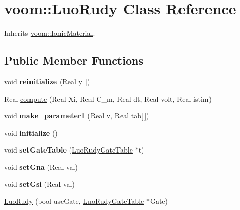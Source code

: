 \hypertarget{classvoom_1_1_luo_rudy}{
\section{voom::LuoRudy Class Reference}
\label{classvoom_1_1_luo_rudy}
}


Inherits \hyperlink{classvoom_1_1_ionic_material}{voom::IonicMaterial}.\subsection*{Public Member Functions}
\begin{DoxyCompactItemize}
\item 
\hypertarget{classvoom_1_1_luo_rudy_a5596df5583aac77101b82ad5719138d2}{
void {\bfseries reinitialize} (Real y\mbox{[}$\,$\mbox{]})}
\label{classvoom_1_1_luo_rudy_a5596df5583aac77101b82ad5719138d2}

\item 
Real \hyperlink{classvoom_1_1_luo_rudy_a183e2b1a92b358944679f9e07e38c4be}{compute} (Real Xi, Real C\_\-m, Real dt, Real volt, Real istim)
\item 
\hypertarget{classvoom_1_1_luo_rudy_a6c2798ab29465368d347537d68019554}{
void {\bfseries make\_\-parameter1} (Real v, Real tab\mbox{[}$\,$\mbox{]})}
\label{classvoom_1_1_luo_rudy_a6c2798ab29465368d347537d68019554}

\item 
\hypertarget{classvoom_1_1_luo_rudy_afb4cb96129ed47c7e8525048ccb1c1a6}{
void {\bfseries initialize} ()}
\label{classvoom_1_1_luo_rudy_afb4cb96129ed47c7e8525048ccb1c1a6}

\item 
\hypertarget{classvoom_1_1_luo_rudy_aa5fe5136d94e06ec677f56674fea7283}{
void {\bfseries setGateTable} (\hyperlink{class_luo_rudy_gate_table}{LuoRudyGateTable} $\ast$t)}
\label{classvoom_1_1_luo_rudy_aa5fe5136d94e06ec677f56674fea7283}

\item 
\hypertarget{classvoom_1_1_luo_rudy_ae6a81b1b164a7e553d5b53082601fa72}{
void {\bfseries setGna} (Real val)}
\label{classvoom_1_1_luo_rudy_ae6a81b1b164a7e553d5b53082601fa72}

\item 
\hypertarget{classvoom_1_1_luo_rudy_a72afcfc94b1cbf457b9775767f7a8aac}{
void {\bfseries setGsi} (Real val)}
\label{classvoom_1_1_luo_rudy_a72afcfc94b1cbf457b9775767f7a8aac}

\item 
\hypertarget{classvoom_1_1_luo_rudy_aa68da803a54d9703ae3235811e8fd6d8}{
\hyperlink{classvoom_1_1_luo_rudy_aa68da803a54d9703ae3235811e8fd6d8}{LuoRudy} (bool useGate, \hyperlink{class_luo_rudy_gate_table}{LuoRudyGateTable} $\ast$Gate)}
\label{classvoom_1_1_luo_rudy_aa68da803a54d9703ae3235811e8fd6d8}


\end{DoxyCompactItemize}

